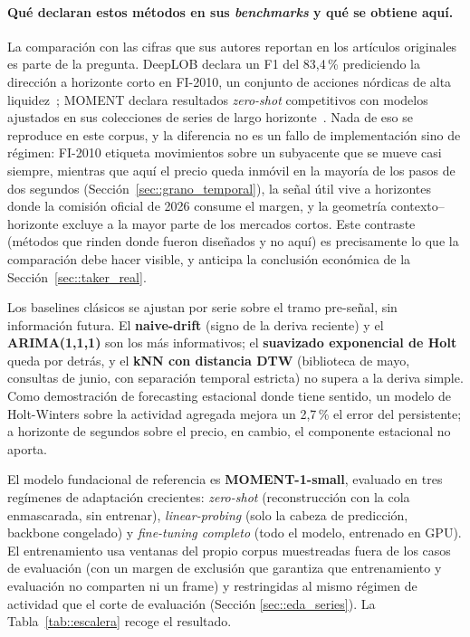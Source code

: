 \paragraph{Qué declaran estos métodos en sus \emph{benchmarks} y qué se obtiene aquí.}
La comparación con las cifras que sus autores reportan en los artículos originales es parte
de la pregunta. DeepLOB declara un F1
del 83,4\,\% prediciendo la dirección a horizonte corto en FI-2010, un conjunto de
acciones nórdicas de alta liquidez~\cite{zhang2019deeplob}; MOMENT declara resultados
\emph{zero-shot} competitivos con modelos ajustados en sus colecciones de series de largo
horizonte~\cite{goswami2024moment}. Nada de eso se reproduce en este corpus, y la
diferencia no es un fallo de implementación sino de régimen: FI-2010 etiqueta movimientos
sobre un subyacente que se mueve casi siempre, mientras que aquí el precio queda inmóvil
en la mayoría de los pasos de dos segundos (Sección~\ref{sec::grano_temporal}), la señal
útil vive a horizontes donde la comisión oficial de 2026 consume el margen, y la
geometría contexto–horizonte excluye a la mayor parte de los mercados cortos. Este
contraste (métodos que rinden donde fueron diseñados y no aquí) es precisamente lo que
la comparación debe hacer visible, y anticipa la conclusión económica de la
Sección~\ref{sec::taker_real}.

Los baselines clásicos se ajustan por serie sobre el tramo pre-señal, sin información
futura. El \textbf{naive-drift} (signo de la deriva reciente) y el \textbf{ARIMA(1,1,1)}
son los más informativos; el \textbf{suavizado exponencial de Holt} queda por detrás, y
el \textbf{kNN con distancia DTW} (biblioteca de mayo, consultas de junio, con
separación temporal estricta) no supera a la deriva simple. Como demostración de
forecasting estacional donde tiene sentido, un modelo de Holt-Winters sobre la actividad
agregada mejora un 2,7\,\% el error del persistente; a horizonte de segundos sobre el
precio, en cambio, el componente estacional no aporta.

El modelo fundacional de referencia es \textbf{MOMENT-1-small}, evaluado en tres regímenes de
adaptación crecientes: \emph{zero-shot} (reconstrucción con la cola enmascarada, sin
entrenar), \emph{linear-probing} (solo la cabeza de predicción, backbone congelado) y
\emph{fine-tuning completo} (todo el modelo, entrenado en GPU). El entrenamiento usa
ventanas del propio corpus muestreadas fuera de los casos de evaluación (con un margen
de exclusión que garantiza que entrenamiento y evaluación no comparten ni un frame) y
restringidas al mismo régimen de actividad que el corte de evaluación (Sección
\ref{sec::eda_series}). La Tabla~\ref{tab::escalera} recoge el resultado.

